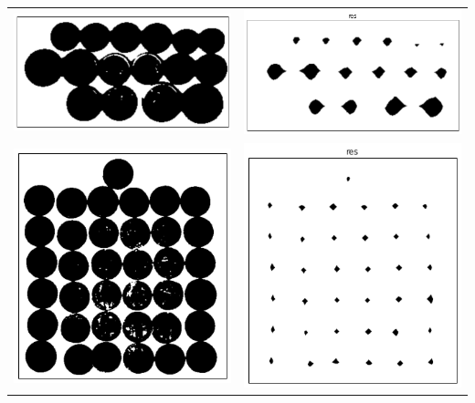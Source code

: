 \documentclass[12pt, a4paper]{article}
\begin{document}
\begin{center}
\begin{tabular}{c c}
			\includegraphics[width=8cm]{Money_7_bin.png} & \includegraphics[width=8cm]{Money_7_res.png} \\
			\includegraphics[width=8cm]{Money_8_bin.png} & \includegraphics[width=8cm]{Money_8_res.png} \\
		\end{tabular}


\end{center}
\end{document}
